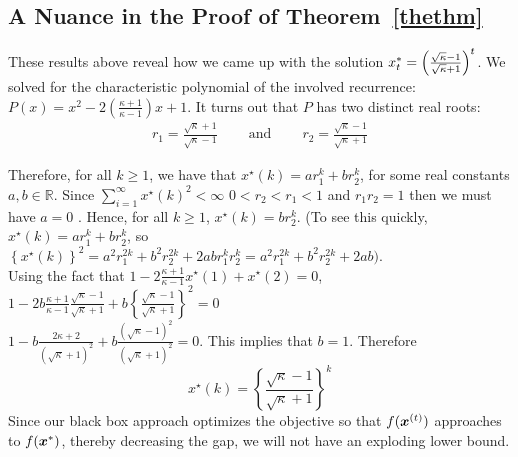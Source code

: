 \documentclass{article}
\begin{document}
\subsection*{A Nuance in the Proof of Theorem~\ref{thethm}}
These results above reveal how we came up with the solution 
$
    {x}^{\ast}_t 
    = 
    \left(
        \frac{\sqrt{\kappa} - 1}{\sqrt{\kappa} + 1}
    \right)^t
$.
We solved for the characteristic polynomial of the involved recurrence: $P(x) = x^2 -2\left(\frac{\kappa + 1}{\kappa - 1}\right)x + 1$. 
It turns out that $P$ has two distinct real roots:
\begin{align*}
    r_1
    =
    \frac{
        \sqrt{\kappa} + 1
    }{
        \sqrt{\kappa} - 1
    }
    \qquad\ \text{and}\ \qquad
    r_2
    =
    \frac{
        \sqrt{\kappa} - 1
    }{
        \sqrt{\kappa} + 1
    }
\end{align*}

Therefore, for all $k \geq 1$, we have that $x^\star(k)=a r_1^k+br_2^k$, for some real constants $a,b \in \mathbb{R}$. Since $\displaystyle{\sum\limits_{i=1}^\infty x^\star(k)^2 < \infty}$ $0<r_2<r_1<1$ and $r_1r_2=1$ then we must have $a=0$ . Hence, for all $k \geq 1$, $x^\star(k)= b r_2^k$. (To see this quickly, $x^\star(k)=ar_1^k+br_2^k$, so $\left\{x^\star(k)\right\}^2=a^2r_1^{2k}+b^2r_2^{2k}+2abr_1^kr_2^k=a^2r_1^{2k}+b^2r_2^{2k}+2ab)$.\\
Using the fact that 
$\displaystyle{1-2 \frac{\kappa+1}{\kappa-1}x^\star(1)+x^\star(2)=0}$,
$\displaystyle{1-2 b\frac{\kappa+1}{\kappa-1}\frac{\sqrt{\kappa}-1}{\sqrt{\kappa}+1}+b\left\{\frac{\sqrt{\kappa}-1}{\sqrt{\kappa}+1}\right\}^2=0}$\\
$\displaystyle{1-b\frac{2\kappa+2}{(\sqrt{\kappa}+1)^2}+b\frac{(\sqrt{\kappa}-1)^2}{(\sqrt{\kappa}+1)^2}=0}$. This implies that $b=1$. Therefore 
$$
x^\star(k)=\left\{\frac{\sqrt{\kappa}-1}{\sqrt{\kappa}+1}\right\}^k
$$
Since our black box approach optimizes the objective so that $f({\bm{x}}^{(t)})$ approaches to $f({\bm{x}}^{\ast})$, thereby decreasing the gap, we will not have an exploding lower bound.
\end{document}
